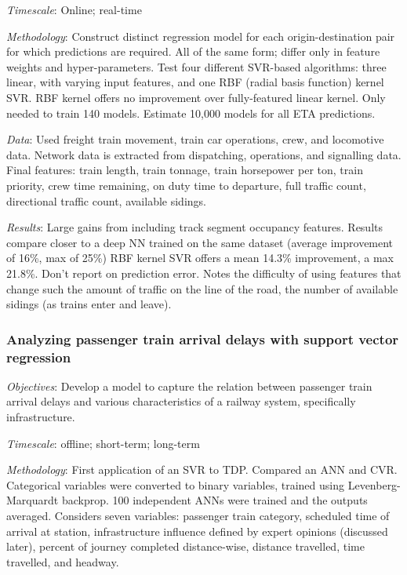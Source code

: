 \documentclass{article}
\begin{document}
\smallskip

\textit{Timescale}: Online; real-time 

\smallskip

\textit{Methodology}: Construct distinct regression model for each origin-destination pair for which predictions are required. All of the same form; differ only in feature weights and hyper-parameters. Test four different SVR-based algorithms: three linear, with varying input features, and one RBF (radial basis function) kernel SVR. RBF kernel offers no improvement over fully-featured linear kernel. Only needed to train 140 models. Estimate 10,000 models for all ETA predictions.

\smallskip

\textit{Data}: Used freight train movement, train car operations, crew, and locomotive data. Network data is extracted from dispatching, operations, and signalling data. Final features: train length, train tonnage, train horsepower per ton, train priority, crew time remaining, on duty time to departure, full traffic count, directional traffic count, available sidings. 

\smallskip

\textit{Results}: Large gains from including track segment occupancy features. Results compare closer to a deep NN trained on the same dataset (average improvement of 16\%, max of 25\%)
RBF kernel SVR offers a mean 14.3\% improvement, a max 21.8\%. Don't report on prediction error. Notes the difficulty of using features that change such the amount of traffic on the line of the road, the number of available sidings (as trains enter and leave).

\subsubsection{Analyzing passenger train arrival delays with support vector regression \cite{markovic_et_al_2015}}

\textit{Objectives}: Develop a model to capture the relation between passenger train arrival delays and various characteristics of a railway system, specifically infrastructure.

\smallskip

\textit{Timescale}: offline; short-term; long-term

\smallskip

\textit{Methodology}: First application of an SVR to TDP.  Compared an ANN and CVR. Categorical variables were converted to binary variables, trained using Levenberg-Marquardt backprop. 100 independent ANNs were trained and the outputs averaged. Considers seven variables: passenger train category, scheduled time of arrival at station, infrastructure influence defined by expert opinions (discussed later), percent of journey completed distance-wise, distance travelled, time travelled, and headway.
\end{document}
